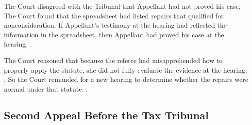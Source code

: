 \documentclass[12pt,\documentclassflag]{michiganCourtOfAppealsBrief}
\begin{document}
The Court disagreed with the Tribunal that Appellant had not proved his case. 
The Court found that the spreadsheet had listed repairs that qualified for nonconsideration.
If Appellant's testimony at the hearing had reflected the information in the spreadsheet, then Appellant had proved his case at the hearing. .



The Court reasoned that because the referee had misapprehended how to properly apply the statute, she did not fully evaluate the evidence at the hearing. .
So the Court remanded for a new hearing to determine whether the repairs were normal under that statute. .

\subsection{Second Appeal Before the Tax Tribunal}
\end{document}
